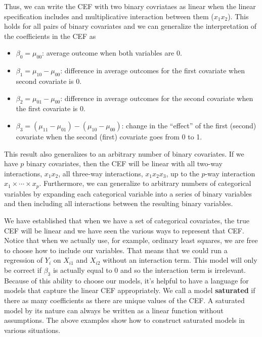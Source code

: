 \documentclass[
  letterpaper,
  DIV=11,
  numbers=noendperiod]{scrreprt}
\providecommand{\tightlist}{%
  \setlength{\itemsep}{0pt}\setlength{\parskip}{0pt}}\usepackage{longtable,booktabs,array}
\theoremstyle{definition}
\theoremstyle{plain}
\theoremstyle{definition}
\theoremstyle{remark}
\begin{document}
Thus, we can write the CEF with two binary covriataes as linear when the
linear specification includes and multiplicative interaction between
them (\(x_1x_2\)). This holds for all pairs of binary covariates and we
can generalize the interpretation of the coefficients in the CEF as

\begin{itemize}
\tightlist
\item
  \(\beta_0 = \mu_{00}\): average outcome when both variables are 0.
\item
  \(\beta_1 = \mu_{10} - \mu_{00}\): difference in average outcomes for
  the first covariate when second covariate is 0.
\item
  \(\beta_2 = \mu_{01} - \mu_{00}\): difference in average outcomes for
  the second covariate when the first covariate is 0.
\item
  \(\beta_3 = (\mu_{11} - \mu_{01}) - (\mu_{10} - \mu_{00})\): change in
  the ``effect'' of the first (second) covariate when the second (first)
  covariate goes from 0 to 1.
\end{itemize}

This result also generalizes to an arbitrary number of binary
covariates. If we have \(p\) binary covariates, then the CEF will be
linear with all two-way interactions, \(x_1x_2\), all three-way
interactions, \(x_1x_2x_3\), up to the \(p\)-way interaction
\(x_1\times\cdots\times x_p\). Furthermore, we can generalize to
arbitrary numbers of categorical variables by expanding each categorical
variable into a series of binary variables and then including all
interactions between the resulting binary variables.

We have established that when we have a set of categorical covariates,
the true CEF will be linear and we have seen the various ways to
represent that CEF. Notice that when we actually use, for example,
ordinary least squares, we are free to choose how to include our
variables. That means that we could run a regression of \(Y_i\) on
\(X_{i1}\) and \(X_{i2}\) without an interaction term. This model will
only be correct if \(\beta_3\) is actually equal to 0 and so the
interaction term is irrelevant. Because of this ability to choose our
models, it's helpful to have a language for models that capture the
linear CEF appropriately. We call a model \textbf{saturated} if there as
many coefficients as there are unique values of the CEF. A saturated
model by its nature can always be written as a linear function without
assumptions. The above examples show how to construct saturated models
in various situations.
\end{document}
